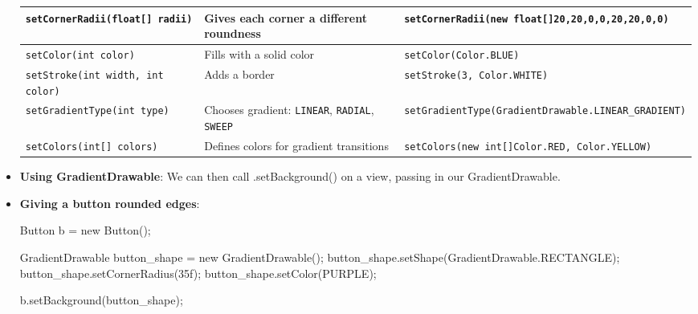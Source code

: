 \documentclass{report}
\begin{document}
\begin{itemize}
\begin{center}
\begin{tabular}{p{4cm}|p{4cm}|p{4cm}}
                    \hline
                    \texttt{setCornerRadii(float[] radii)} & Gives each corner a different roundness & \texttt{setCornerRadii(new float[]{20,20,0,0,20,20,0,0})} \\
                    \hline
                    \texttt{setColor(int color)} & Fills with a solid color & \texttt{setColor(Color.BLUE)} \\
                    \hline
                    \texttt{setStroke(int width, int color)} & Adds a border & \texttt{setStroke(3, Color.WHITE)} \\
                    \hline
                    \texttt{setGradientType(int type)} & Chooses gradient: \texttt{LINEAR}, \texttt{RADIAL}, \texttt{SWEEP} & \texttt{setGradientType(GradientDrawable.LINEAR\_GRADIENT)} \\
                    \hline
                    \texttt{setColors(int[] colors)} & Defines colors for gradient transitions & \texttt{setColors(new int[]{Color.RED, Color.YELLOW})} \\
                    \hline
                \end{tabular}
            \end{center}
        \item \textbf{Using GradientDrawable}: We can then call .setBackground() on a view, passing in our GradientDrawable.
        \item \textbf{Giving a button rounded edges}:
            \bigbreak \noindent 
            \begin{javacode}
                Button b = new Button();

                GradientDrawable button_shape = new GradientDrawable();
                button_shape.setShape(GradientDrawable.RECTANGLE);
                button_shape.setCornerRadius(35f);
                button_shape.setColor(PURPLE);

                b.setBackground(button_shape);
            \end{javacode}
    \end{itemize}

    \pagebreak 
\end{document}
